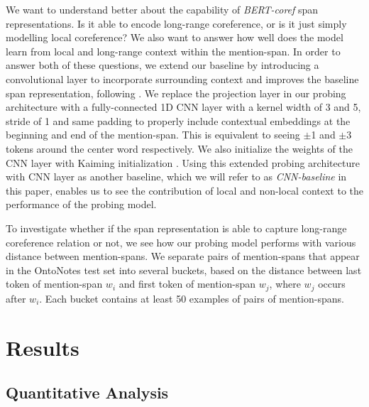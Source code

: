 \documentclass[11pt]{article}
\begin{document}
We want to understand better about the capability of \textit{BERT-coref} span representations. Is it able to encode long-range coreference, or is it just simply modelling local coreference? We also want to answer how well does the model learn from local and long-range context within the mention-span. In order to answer both of these questions, we extend our baseline by introducing a convolutional layer to incorporate surrounding context and improves the baseline span representation, following \parencite{tenney2019context}. We replace the projection layer in our probing architecture with a fully-connected 1D CNN layer with a kernel width of 3 and 5, stride of 1 and same padding to properly include contextual embeddings at the beginning and end of the mention-span. This is equivalent to seeing $\pm$1 and $\pm$3 tokens around the center word respectively. We also initialize the weights of the CNN layer with Kaiming initialization \parencite{kaiming}. Using this extended probing architecture with CNN layer as another baseline, which we will refer to as \textit{CNN-baseline} in this paper, enables us to see the contribution of local and non-local context to the performance of the probing model. 

To investigate whether if the span representation is able to capture long-range coreference relation or not, we see how our probing model performs with various distance between mention-spans. We separate pairs of mention-spans that appear in the OntoNotes test set into several buckets, based on the distance between last token of mention-span $w_{i}$ and first token of mention-span $w_{j}$, where $w_{j}$ occurs after $w_{i}$. Each bucket contains at least 50 examples of pairs of mention-spans. 




\section{Results}
\subsection{Quantitative Analysis}
\end{document}
